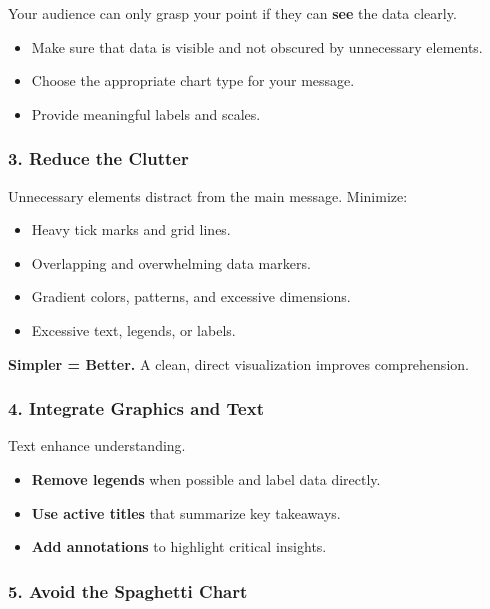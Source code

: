 \documentclass[
  11pt,
]{article}
\providecommand{\tightlist}{%
  \setlength{\itemsep}{0pt}\setlength{\parskip}{0pt}}
\begin{document}
Your audience can only grasp your point if they can \textbf{see} the
data clearly.

\begin{itemize}
\tightlist
\item
  Make sure that data is visible and not obscured by unnecessary
  elements.
\item
  Choose the appropriate chart type for your message.
\item
  Provide meaningful labels and scales.
\end{itemize}

\subsubsection{\texorpdfstring{\textbf{3. Reduce the
Clutter}}{3. Reduce the Clutter}}\label{reduce-the-clutter}

Unnecessary elements distract from the main message. Minimize:

\begin{itemize}
\tightlist
\item
  Heavy tick marks and grid lines.
\item
  Overlapping and overwhelming data markers.
\item
  Gradient colors, patterns, and excessive dimensions.
\item
  Excessive text, legends, or labels.
\end{itemize}

\textbf{Simpler = Better.} A clean, direct visualization improves
comprehension.

\subsubsection{\texorpdfstring{\textbf{4. Integrate Graphics and
Text}}{4. Integrate Graphics and Text}}\label{integrate-graphics-and-text}

Text enhance understanding.

\begin{itemize}
\tightlist
\item
  \textbf{Remove legends} when possible and label data directly.
\item
  \textbf{Use active titles} that summarize key takeaways.
\item
  \textbf{Add annotations} to highlight critical insights.
\end{itemize}

\subsubsection{\texorpdfstring{\textbf{5. Avoid the Spaghetti
Chart}}{5. Avoid the Spaghetti Chart}}\label{avoid-the-spaghetti-chart}
\end{document}
